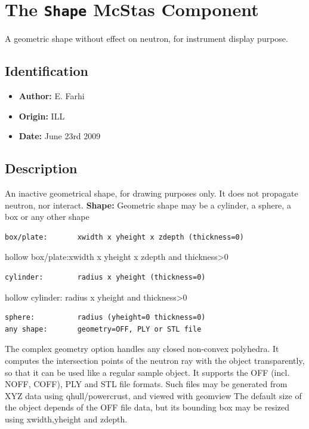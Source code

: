 \section{The \texttt{Shape} McStas Component}
A geometric shape without effect on neutron, for instrument display purpose.

\subsection*{Identification}
\begin{itemize}
  \item \textbf{Author:} E. Farhi
  \item \textbf{Origin:} ILL
  \item \textbf{Date:} June 23rd 2009
\end{itemize}

\subsection*{Description}
An inactive geometrical shape, for drawing purposes only. It does not propagate neutron, nor interact. \textbf{Shape:} Geometric shape may be a cylinder, a sphere, a box or any other shape

\begin{verbatim}
box/plate:       xwidth x yheight x zdepth (thickness=0)
\end{verbatim}

hollow box/plate:xwidth x yheight x zdepth and thickness\textgreater{}0

\begin{verbatim}
cylinder:        radius x yheight (thickness=0)
\end{verbatim}

hollow cylinder: radius x yheight and thickness\textgreater{}0

\begin{verbatim}
sphere:          radius (yheight=0 thickness=0)
any shape:       geometry=OFF, PLY or STL file
\end{verbatim}

The complex geometry option handles any closed non-convex polyhedra. It computes the intersection points of the neutron ray with the object transparently, so that it can be used like a regular sample object. It supports the OFF (incl. NOFF, COFF), PLY and STL file formats. Such files may be generated from XYZ data using qhull/powercrust, and viewed with geomview The default size of the object depends of the OFF file data, but its bounding box may be resized using xwidth,yheight and zdepth.

